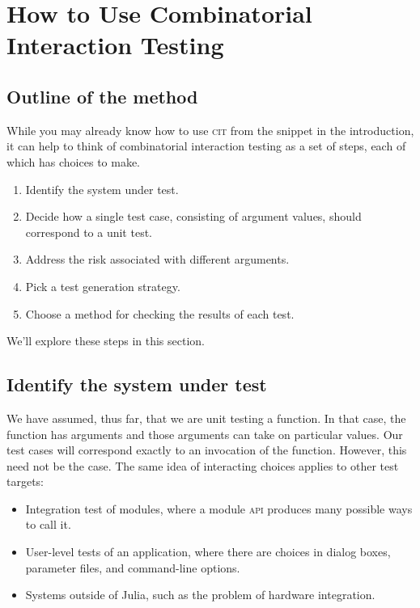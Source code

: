 \documentclass{juliacon}
\newcommand{\cit}{\textsc{cit}\xspace}
\begin{document}
\section{How to Use Combinatorial Interaction Testing}\label{sec:how-to-use}

\subsection{Outline of the method}

While you may already know how to use \cit from the snippet in the introduction, it can help to think of combinatorial interaction testing as a set of steps, each of which has choices to make.
\begin{enumerate}
   \item Identify the system under test.
   \item Decide how a single test case, consisting of argument values, should correspond to a unit test.
   \item Address the risk associated with different arguments.
   \item Pick a test generation strategy.
   \item Choose a method for checking the results of each test.
\end{enumerate}
We'll explore these steps in this section.

\subsection{Identify the system under test}

We have assumed, thus far, that we are unit testing a function. In that case, the function has arguments and those arguments can take on particular values. Our test cases will correspond exactly to an invocation of the function. However, this need not be the case. The same idea of interacting choices applies to other test targets:

\begin{itemize}
\item Integration test of modules, where a module \textsc{api} produces many possible ways to call it.
\item User-level tests of an application, where there are choices in dialog boxes, parameter files, and command-line options.
\item Systems outside of Julia, such as the problem of hardware integration.
\end{itemize}
\end{document}
